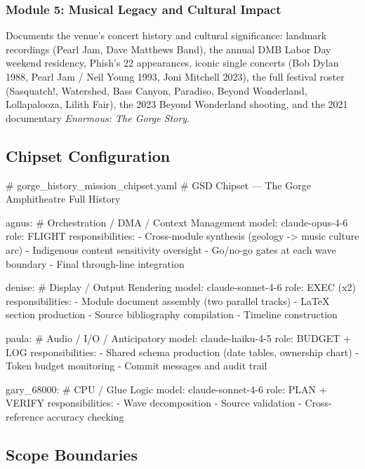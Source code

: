 \documentclass[11pt,letterpaper]{article}
\begin{document}
\subsubsection{Module 5: Musical Legacy and Cultural Impact}
Documents the venue's concert history and cultural significance: landmark recordings (Pearl Jam, Dave Matthews Band), the annual DMB Labor Day weekend residency, Phish's 22 appearances, iconic single concerts (Bob Dylan 1988, Pearl Jam / Neil Young 1993, Joni Mitchell 2023), the full festival roster (Sasquatch!, Watershed, Bass Canyon, Paradiso, Beyond Wonderland, Lollapalooza, Lilith Fair), the 2023 Beyond Wonderland shooting, and the 2021 documentary \textit{Enormous: The Gorge Story}.

\subsection{Chipset Configuration}

\begin{asciibox}
# gorge_history_mission_chipset.yaml
# GSD Chipset --- The Gorge Amphitheatre Full History

agnus:           # Orchestration / DMA / Context Management
  model: claude-opus-4-6
  role: FLIGHT
  responsibilities:
    - Cross-module synthesis (geology -> music culture arc)
    - Indigenous content sensitivity oversight
    - Go/no-go gates at each wave boundary
    - Final through-line integration

denise:          # Display / Output Rendering
  model: claude-sonnet-4-6
  role: EXEC (x2)
  responsibilities:
    - Module document assembly (two parallel tracks)
    - LaTeX section production
    - Source bibliography compilation
    - Timeline construction

paula:           # Audio / I/O / Anticipatory
  model: claude-haiku-4-5
  role: BUDGET + LOG
  responsibilities:
    - Shared schema production (date tables, ownership chart)
    - Token budget monitoring
    - Commit messages and audit trail

gary_68000:      # CPU / Glue Logic
  model: claude-sonnet-4-6
  role: PLAN + VERIFY
  responsibilities:
    - Wave decomposition
    - Source validation
    - Cross-reference accuracy checking
\end{asciibox}

\subsection{Scope Boundaries}
\end{document}
